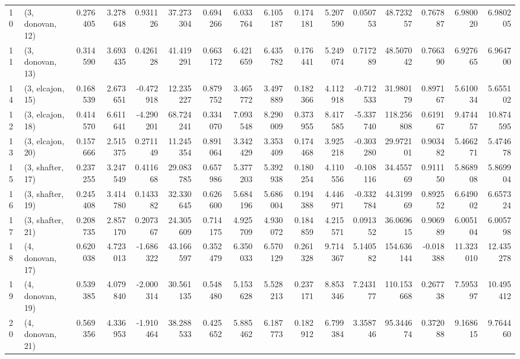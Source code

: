\begin{tabular}{llrrrrrrrrrrrrrr}
10 &  (3, donovan, 12) &   0.276405 &  3.278648 &  0.931126 &  37.273304 &  0.694266 &   6.033764 &  6.105187 &  0.174181 &  5.207590 &  0.050753 &   48.723257 &  0.767887 &   6.980020 &   6.980205 \\
11 &  (3, donovan, 13) &   0.314590 &  3.693435 &  0.426128 &  41.419291 &  0.663172 &   6.421659 &  6.435782 &  0.176441 &  5.249074 &  0.717289 &   48.507042 &  0.766390 &   6.927665 &   6.964700 \\
14 &  (3, elcajon, 15) &   0.168539 &  2.673651 & -0.472918 &  12.235227 &  0.879752 &   3.465772 &  3.497889 &  0.182366 &  4.112918 & -0.712533 &   31.980179 &  0.897167 &   5.610034 &   5.655102 \\
12 &  (3, elcajon, 18) &   0.414570 &  6.611641 & -4.290201 &  68.724241 &  0.334070 &   7.093548 &  8.290009 &  0.373955 &  8.417585 & -5.337740 &  118.256808 &  0.619167 &   9.474457 &  10.874595 \\
13 &  (3, elcajon, 20) &   0.157666 &  2.515375 &  0.271149 &  11.245354 &  0.891064 &   3.342429 &  3.353409 &  0.174468 &  3.925218 & -0.303280 &   29.972101 &  0.903482 &   5.466271 &   5.474678 \\
15 &  (3, shafter, 17) &   0.237255 &  3.247549 &  0.411668 &  29.083785 &  0.657986 &   5.377203 &  5.392938 &  0.180254 &  4.110556 & -0.108116 &   34.455769 &  0.911150 &   5.868908 &   5.869904 \\
16 &  (3, shafter, 19) &   0.245408 &  3.414780 &  0.143382 &  32.330645 &  0.626600 &   5.684196 &  5.686004 &  0.194388 &  4.446971 & -0.332784 &   44.319969 &  0.892552 &   6.649002 &   6.657324 \\
17 &  (3, shafter, 21) &   0.208735 &  2.857170 &  0.207367 &  24.305609 &  0.714175 &   4.925709 &  4.930072 &  0.184859 &  4.215571 &  0.091352 &   36.069615 &  0.906989 &   6.005104 &   6.005798 \\
18 &  (4, donovan, 17) &   0.620038 &  4.723013 & -1.686322 &  43.166597 &  0.352479 &   6.350033 &  6.570129 &  0.261328 &  9.714367 &  5.140582 &  154.636144 & -0.018388 &  11.323010 &  12.435278 \\
19 &  (4, donovan, 19) &   0.539385 &  4.079840 & -2.000314 &  30.561135 &  0.548480 &   5.153628 &  5.528213 &  0.237171 &  8.853346 &  7.243177 &  110.153668 &  0.267738 &   7.595397 &  10.495412 \\
20 &  (4, donovan, 21) &   0.569356 &  4.336953 & -1.910464 &  38.288533 &  0.425652 &   5.885462 &  6.187773 &  0.182912 &  6.799384 &  3.358746 &   95.344674 &  0.372088 &   9.168615 &   9.764460 \\

\end{tabular}
